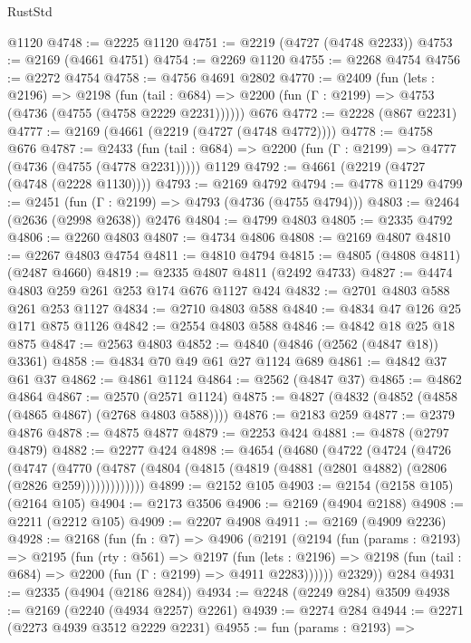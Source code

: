 \begin{lexlean}{RustStd}
\begin{coremodule}
    @1120
@4748 := @2225 @1120
@4751 := @2219 (@4727 (@4748 @2233))
@4753 := @2169 (@4661 @4751)
@4754 := @2269 @1120
@4755 := @2268 @4754
@4756 := @2272 @4754
@4758 := @4756 @4691 @2802
@4770 := @2409
    (fun (lets : @2196) =>
    @2198
      (fun (tail : @684) => @2200 (fun (Γ : @2199) => @4753 (@4736 (@4755 (@4758 @2229 @2231))))))
    @676
@4772 := @2228 (@867 @2231)
@4777 := @2169 (@4661 (@2219 (@4727 (@4748 @4772))))
@4778 := @4758 @676
@4787 := @2433
    (fun (tail : @684) => @2200 (fun (Γ : @2199) => @4777 (@4736 (@4755 (@4778 @2231)))))
    @1129
@4792 := @4661 (@2219 (@4727 (@4748 (@2228 @1130))))
@4793 := @2169 @4792
@4794 := @4778 @1129
@4799 := @2451 (fun (Γ : @2199) => @4793 (@4736 (@4755 @4794)))
@4803 := @2464 (@2636 (@2998 @2638)) @2476
@4804 := @4799 @4803
@4805 := @2335 @4792
@4806 := @2260 @4803
@4807 := @4734 @4806
@4808 := @2169 @4807
@4810 := @2267 @4803 @4754
@4811 := @4810 @4794
@4815 := @4805 (@4808 @4811) (@2487 @4660)
@4819 := @2335 @4807 @4811 (@2492 @4733)
@4827 := @4474 @4803 @259 @261 @253 @174 @676 @1127 @424
@4832 := @2701 @4803 @588 @261 @253 @1127
@4834 := @2710 @4803 @588
@4840 := @4834 @47 @126 @25 @171 @875 @1126
@4842 := @2554 @4803 @588
@4846 := @4842 @18 @25 @18 @875
@4847 := @2563 @4803
@4852 := @4840 (@4846 (@2562 (@4847 @18)) @3361)
@4858 := @4834 @70 @49 @61 @27 @1124 @689
@4861 := @4842 @37 @61 @37
@4862 := @4861 @1124
@4864 := @2562 (@4847 @37)
@4865 := @4862 @4864
@4867 := @2570 (@2571 @1124)
@4875 := @4827 (@4832 (@4852 (@4858 (@4865 @4867) (@2768 @4803 @588))))
@4876 := @2183 @259
@4877 := @2379 @4876
@4878 := @4875 @4877
@4879 := @2253 @424
@4881 := @4878 (@2797 @4879)
@4882 := @2277 @424
@4898 := @4654
    (@4680
      (@4722
        (@4724
          (@4726
            (@4747
              (@4770
                (@4787 (@4804 (@4815 (@4819 (@4881 (@2801 @4882) (@2806 (@2826 @259)))))))))))))
@4899 := @2152 @105
@4903 := @2154 (@2158 @105) (@2164 @105)
@4904 := @2173 @3506
@4906 := @2169 (@4904 @2188)
@4908 := @2211 (@2212 @105)
@4909 := @2207 @4908
@4911 := @2169 (@4909 @2236)
@4928 := @2168
    (fun (fn : @7) =>
    @4906
      (@2191
        (@2194
          (fun (params : @2193) =>
          @2195
            (fun (rty : @561) =>
            @2197
              (fun (lets : @2196) =>
              @2198 (fun (tail : @684) => @2200 (fun (Γ : @2199) => @4911 @2283))))))
        @2329))
    @284
@4931 := @2335 (@4904 (@2186 @284))
@4934 := @2248 (@2249 @284) @3509
@4938 := @2169 (@2240 (@4934 @2257) @2261)
@4939 := @2274 @284
@4944 := @2271 (@2273 @4939 @3512 @2229 @2231)
@4955 := fun (params : @2193) =>

\end{coremodule}
\end{lexlean}
